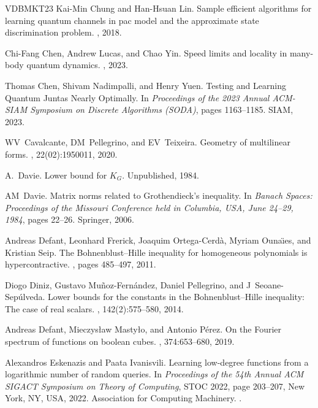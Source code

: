 \documentclass[11pt]{article}
\theoremstyle{plain}
\theoremstyle{plain}
\theoremstyle{definition}
\theoremstyle{remark}
\theoremstyle{named}
\begin{document}
\begin{thebibliography}{VDBMKT23}
Kai-Min Chung and Han-Hsuan Lin.
\newblock Sample efficient algorithms for learning quantum channels in pac
  model and the approximate state discrimination problem.
, 2018.

Chi-Fang Chen, Andrew Lucas, and Chao Yin.
\newblock Speed limits and locality in many-body quantum dynamics.
, 2023.

Thomas Chen, Shivam Nadimpalli, and Henry Yuen.
\newblock Testing and {L}earning {Q}uantum {J}untas {N}early {O}ptimally.
\newblock In {\em Proceedings of the 2023 Annual ACM-SIAM Symposium on Discrete
  Algorithms (SODA)}, pages 1163--1185. SIAM, 2023.

WV~Cavalcante, DM~Pellegrino, and EV~Teixeira.
\newblock Geometry of multilinear forms.
, 22(02):1950011,
  2020.

A.~Davie.
\newblock Lower bound for {$K_G$}.
\newblock Unpublished, 1984.

AM~Davie.
\newblock Matrix norms related to {G}rothendieck's inequality.
\newblock In {\em Banach Spaces: Proceedings of the Missouri Conference held in
  Columbia, USA, June 24--29, 1984}, pages 22--26. Springer, 2006.

Andreas Defant, Leonhard Frerick, Joaquim Ortega-Cerd{\`a}, Myriam
  Ouna{\"\i}es, and Kristian Seip.
\newblock The {B}ohnenblust--{H}ille inequality for homogeneous polynomials is
  hypercontractive.
, pages 485--497, 2011.

Diogo Diniz, Gustavo Mu{\~n}oz-Fern{\'a}ndez, Daniel Pellegrino, and
  J~Seoane-Sep{\'u}lveda.
\newblock Lower bounds for the constants in the {B}ohnenblust--{H}ille
  inequality: {T}he case of real scalars.
,
  142(2):575--580, 2014.

Andreas Defant, Mieczys{\l}aw Masty{\l}o, and Antonio P{\'e}rez.
\newblock On the {F}ourier spectrum of functions on boolean cubes.
, 374:653--680, 2019.

Alexandros Eskenazis and Paata Ivanisvili.
\newblock Learning low-degree functions from a logarithmic number of random
  queries.
\newblock In {\em Proceedings of the 54th Annual ACM SIGACT Symposium on Theory
  of Computing}, STOC 2022, page 203–207, New York, NY, USA, 2022.
  Association for Computing Machinery.
\newblock \href {https://doi.org/10.1145/3519935.3519981}
  {}.


\end{thebibliography}
\end{document}
